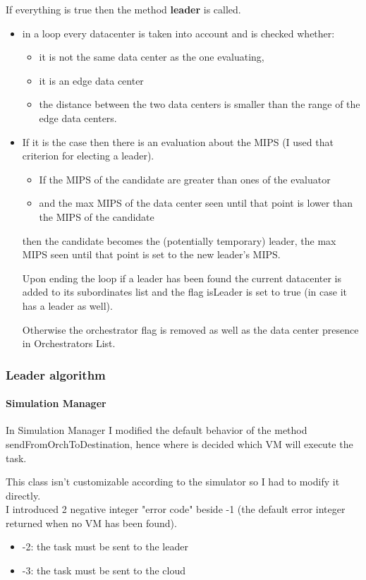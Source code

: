 \documentclass[12pt]{report}
\begin{document}
If everything is true then the method \textbf{leader} is called.
  	\begin{itemize}
 		\item in a loop every datacenter is taken into account and is checked whether:
 		\begin{itemize}
 			\item it is not the same data center as the one evaluating,
 			\item it is an edge data center
 			\item the distance between the two data centers is smaller than the range of the edge data centers.
 		\end{itemize}
 		\item If it is the case then there is an evaluation about the MIPS (I used that criterion for electing a leader).
 		\begin{itemize}
 			\item If the MIPS of the candidate are greater than ones of the evaluator
 			\item and the max MIPS of the data center seen until that point is lower than the MIPS of the candidate
 		\end{itemize}

then the candidate becomes the (potentially temporary) leader, the max MIPS seen until that point is set to the new leader's MIPS.

Upon ending the loop if a leader has been found the current datacenter is added to its subordinates list and the flag isLeader is set to true (in case it has a leader as well).
 		
Otherwise the orchestrator flag is removed as well as the data center presence in Orchestrators List.
  	\end{itemize}
\subsubsection*{Leader algorithm}
\paragraph{Simulation Manager}

In Simulation Manager I modified the default behavior of the method sendFromOrchToDestination, hence where is decided which VM will execute the task.

This class isn't customizable according to the simulator so I had to modify it directly.\\
I introduced 2 negative integer "error code" beside -1 (the default error integer returned when no VM has been found).
\begin{itemize}
	\item -2: the task must be sent to the leader
	\item -3: the task must be sent to the cloud
\end{itemize}
\end{document}
